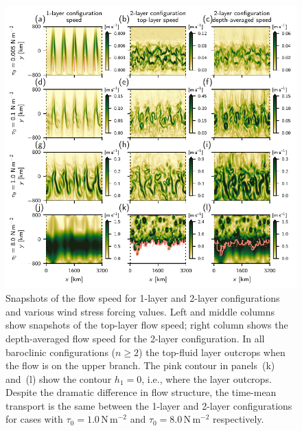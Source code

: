 \documentclass{agujournal2019}
\newcommand{\Pa}		{\mathrm{N}\,\mathrm{m}^{-2}}
\begin{document}
\begin{figure}
\centering
\noindent\includegraphics{snapshots/snapshots}
\caption{Snapshots of the flow speed for 1-layer and 2-layer configurations and various wind stress forcing values. Left and middle columns show snapshots of the top-layer flow speed; right column shows the depth-averaged flow speed for the 2-layer configuration. In all baroclinic configurations ($n\ge 2$) the top-fluid layer outcrops when the flow is on the upper branch. The pink contour in panels~(k) and~(l) show the contour $h_1=0$, i.e., where the layer outcrops. Despite the dramatic difference in flow structure, the time-mean transport is the same {\color{black}between the 1-layer and 2-layer configurations} for cases with $\tau_0=1.0\,\Pa$ and $\tau_0=8.0\,\Pa$ {\color{black}respectively}.}\label{fig:snapshots}
\end{figure}
\end{document}
